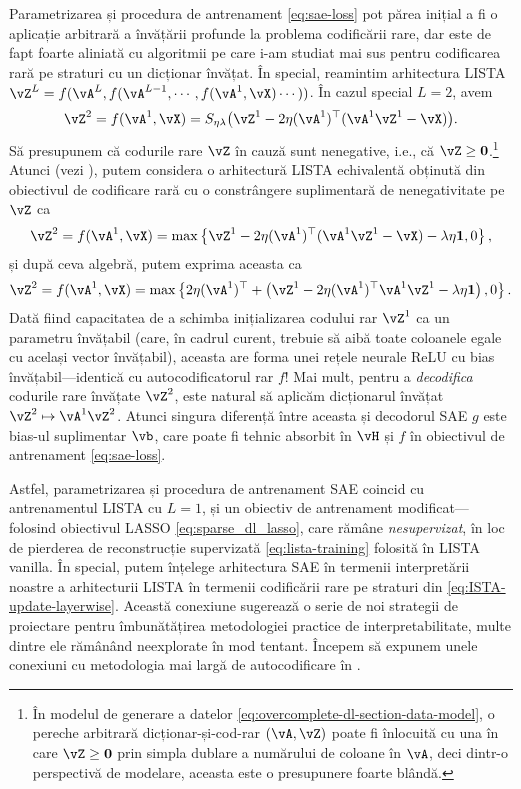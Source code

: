 \documentclass[../../book-main_ro.tex]{subfiles}
\begin{document}
Parametrizarea și procedura de antrenament \eqref{eq:sae-loss} pot părea inițial
a fi o aplicație arbitrară a învățării profunde la problema codificării
rare, dar este de fapt foarte aliniată cu algoritmii pe care i-am studiat
mai sus pentru codificarea rară pe straturi cu un dicționar învățat.
În special, reamintim arhitectura LISTA %
$\vZ^{L} = f(\vA^L, f(\vA^{L-1}, \cdots, f(\vA^1, \vX) \cdots ))$.
În cazul special $L=2$, avem
\begin{equation}
    \vZ^2 = f(\vA^1, \vX) 
    =S_{\eta\lambda}\rp{\vZ^{1} - 2\eta(\vA^{1})^{\top}(\vA^1\vZ^{1} - \vX)}.
\end{equation}
Să presupunem că codurile rare $\vZ$ în cauză sunt nenegative, i.e.,
că $\vZ \geq \Zero$.\footnote{În modelul de generare a datelor
\eqref{eq:overcomplete-dl-section-data-model}, o pereche arbitrară
dicționar-și-cod-rar $(\vA, \vZ)$ poate fi înlocuită cu una în care
$\vZ \geq \Zero$ prin simpla dublare a numărului de coloane în $\vA$, deci dintr-o
perspectivă de modelare, aceasta este o presupunere foarte blândă.}
Atunci (vezi ), putem considera o arhitectură
LISTA echivalentă obținută din obiectivul de codificare rară cu o constrângere
suplimentară de nenegativitate pe $\vZ$ ca
\begin{equation}
    \vZ^2 = f(\vA^1, \vX) 
    =\max \set*{\vZ^{1} - 2\eta(\vA^{1})^{\top}(\vA^1\vZ^{1} - \vX)
    - \lambda\eta \mathbf{1}, 0},
\end{equation}
și după ceva algebră, putem exprima aceasta ca
\begin{equation}
    \vZ^2 = f(\vA^1, \vX) 
    =\max \set*{
        2\eta(\vA^{1})^{\top}
        +
        \left(
        \vZ^{1} - 2\eta(\vA^{1})^{\top}\vA^1\vZ^{1} - \lambda\eta \mathbf{1}
        \right), 0
    }.
\end{equation}
Dată fiind capacitatea de a schimba inițializarea codului rar $\vZ^1$ ca
un parametru învățabil (care, în cadrul curent, trebuie să aibă toate coloanele
egale cu același vector învățabil), aceasta are forma unei rețele neurale ReLU
cu bias învățabil---identică cu autocodificatorul rar $f$!
Mai mult, pentru a \textit{decodifica} codurile rare învățate $\vZ^2$, este natural să
aplicăm dicționarul învățat $\vZ^2 \mapsto \vA^1 \vZ^2$. Atunci singura
diferență între aceasta și decodorul SAE $g$ este bias-ul suplimentar $\vb$,
care poate fi tehnic absorbit în $\vH$ și $f$ în obiectivul de antrenament
\eqref{eq:sae-loss}.

Astfel, parametrizarea și procedura de antrenament SAE coincid cu
antrenamentul LISTA cu $L=1$, și un obiectiv de antrenament modificat---folosind
obiectivul LASSO \eqref{eq:sparse_dl_lasso}, care rămâne {\em nesupervizat}, în loc
de pierderea de reconstrucție supervizată \eqref{eq:lista-training} folosită în LISTA
vanilla. În special, putem înțelege arhitectura SAE în termenii interpretării
noastre a arhitecturii LISTA în termenii codificării rare pe straturi din
\eqref{eq:ISTA-update-layerwise}. Această conexiune sugerează o serie de noi
strategii de proiectare pentru îmbunătățirea metodologiei practice de interpretabilitate, multe
dintre ele rămânând neexplorate în mod tentant. Începem să expunem unele conexiuni cu
metodologia mai largă de autocodificare în .
\end{document}
